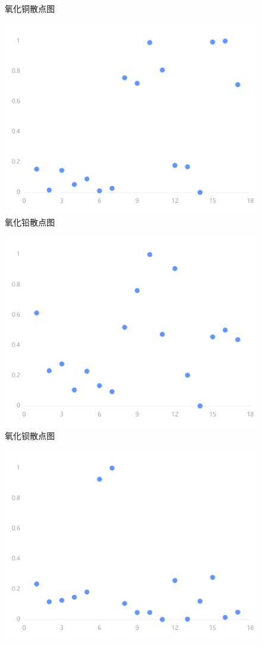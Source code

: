 \documentclass[UTF8]{ctexart}
\begin{document}
\begin{figure}[H]
    \caption{氧化铜散点图} %
\end{figure}\begin{figure}[H]\centering
    \includegraphics[width=1\textwidth,height=0.6\textwidth]{img/8.png} %
    \caption{氧化铅散点图} %
\end{figure}\begin{figure}[H]\centering
    \includegraphics[width=1\textwidth,height=0.6\textwidth]{img/9.png} %
    \caption{氧化钡散点图} %
\end{figure}\begin{figure}[H]\centering
    \includegraphics[width=1\textwidth,height=0.6\textwidth]{img/10.png} %

\end{figure}
\end{document}

